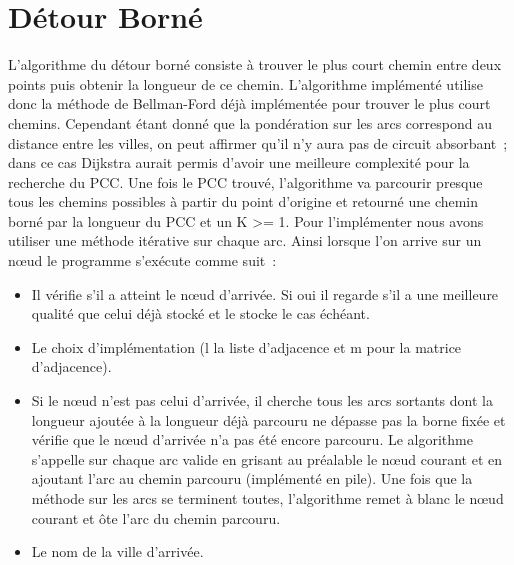 \section{Détour Borné}
L'algorithme du détour borné consiste à trouver le plus court chemin entre deux points puis obtenir la longueur de ce chemin. L'algorithme implémenté utilise donc la méthode de Bellman-Ford déjà implémentée pour trouver le plus court chemins. Cependant étant donné que la pondération sur les arcs correspond au distance entre les villes, on peut affirmer qu'il n'y aura pas de circuit absorbant ; dans ce cas Dijkstra aurait permis d'avoir une meilleure complexité pour la recherche du PCC.
Une fois le PCC trouvé, l'algorithme va parcourir presque tous les chemins possibles à partir du point d'origine et retourné une chemin borné par la longueur du PCC et un K >= 1. Pour l'implémenter nous avons utiliser une méthode itérative sur chaque arc. Ainsi lorsque l'on arrive sur un nœud le programme s’exécute comme suit :
\begin{itemize}
\item
Il vérifie s'il a atteint le nœud d'arrivée. Si oui il regarde s'il a une meilleure qualité que celui déjà stocké et le stocke le cas échéant.\item
Le choix d'implémentation (l la liste d'adjacence et m pour la matrice d'adjacence).
\item
Si le nœud n'est pas celui d'arrivée, il cherche tous les arcs sortants dont la longueur ajoutée à la longueur déjà parcouru ne dépasse pas la borne fixée et vérifie que le nœud d'arrivée n'a pas été encore parcouru. Le algorithme s'appelle sur chaque arc valide en grisant au préalable le nœud courant et en ajoutant l'arc au chemin parcouru (implémenté en pile). Une fois que la méthode sur les arcs se terminent toutes, l'algorithme remet à blanc le nœud courant et ôte l'arc du chemin parcouru.\item
Le nom de la ville d'arrivée.
\end{itemize}



\clearpage
